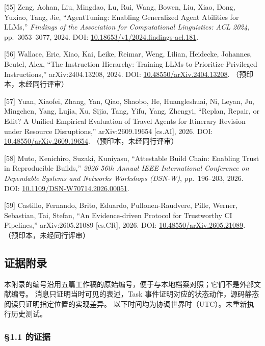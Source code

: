 \documentclass[
]{article}
\begin{document}
{[}55{]} Zeng, Aohan, Liu, Mingdao, Lu, Rui, Wang, Bowen, Liu, Xiao,
Dong, Yuxiao, Tang, Jie, ``AgentTuning: Enabling Generalized Agent
Abilities for LLMs,'' \emph{Findings of the Association for
Computational Linguistics: ACL 2024}, pp.~3053--3077, 2024. DOI:
\href{https://doi.org/10.18653/v1/2024.findings-acl.181}{10.18653/v1/2024.findings-acl.181}.

{[}56{]} Wallace, Eric, Xiao, Kai, Leike, Reimar, Weng, Lilian,
Heidecke, Johannes, Beutel, Alex, ``The Instruction Hierarchy: Training
LLMs to Prioritize Privileged Instructions,'' arXiv:2404.13208, 2024.
DOI:
\href{https://doi.org/10.48550/arXiv.2404.13208}{10.48550/arXiv.2404.13208}.
（预印本，未经同行评审）

{[}57{]} Yuan, Xiaofei, Zhang, Yan, Qiao, Shaobo, He, Huangleshuai, Ni,
Leyan, Ju, Mingchen, Yang, Lujia, Xu, Sijia, Tang, Yifu, Yang, Zhengyi,
``Replan, Repair, or Edit? A Unified Empirical Evaluation of Travel
Agents for Itinerary Revision under Resource Disruptions,''
arXiv:2609.19654 {[}cs.AI{]}, 2026. DOI:
\href{https://doi.org/10.48550/arXiv.2609.19654}{10.48550/arXiv.2609.19654}.
（预印本，未经同行评审）

{[}58{]} Muto, Kenichiro, Suzaki, Kuniyasu, ``Attestable Build Chain:
Enabling Trust in Reproducible Builds,'' \emph{2026 56th Annual IEEE
International Conference on Dependable Systems and Networks Workshops
(DSN-W)}, pp.~196--203, 2026. DOI:
\href{https://doi.org/10.1109/DSN-W70714.2026.00051}{10.1109/DSN-W70714.2026.00051}.

{[}59{]} Castillo, Fernando, Brito, Eduardo, Pullonen-Raudvere, Pille,
Werner, Sebastian, Tai, Stefan, ``An Evidence-driven Protocol for
Trustworthy CI Pipelines,'' arXiv:2605.21089 {[}cs.CR{]}, 2026. DOI:
\href{https://doi.org/10.48550/arXiv.2605.21089}{10.48550/arXiv.2605.21089}.
（预印本，未经同行评审）

\subsection{证据附录}\label{ux8bc1ux636eux9644ux5f55}

本附录的编号沿用五篇工作稿的原始编号，便于与本地档案对照；它们不是外部文献编号。
消息只证明当时可见的表述，Task
事件证明对应的状态动作，源码静态阅读只证明指定位置的实现差异。
以下时间均为协调世界时（UTC）。未重新执行历史测试。

\subsubsection{§1.1 的证据}\label{ux7684ux8bc1ux636e}
\end{document}
